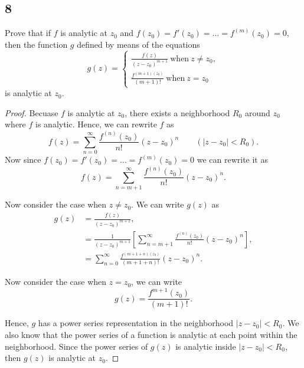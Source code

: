 \documentclass{article}
\begin{document}
\subsection*{8}
Prove that if $f$ is analytic at $z_0$ and $f(z_0) = f'(z_0) = \dots = f^{(m)}(z_0)=0$,
then the function $g$ defined by means of the equations
\begin{equation*}
    g(z) = \begin{cases}
        \frac{f(z)}{(z-z_0)^{m+1}} \ \text{when} \ z \neq z_0, \\
        \frac{f^{(m+1)(z_0)}}{(m+1)!} \ \text{when} \ z = z_0
    \end{cases}
\end{equation*}
is analytic at $z_0$.

\begin{proof}
    Becuase $f$ is analytic at $z_0$, there exists a neighborhood $R_0$ around $z_0$ where
    $f$ is analytic. Hence, we can rewrite $f$ as
    \begin{equation*}
        f(z) = \sum_{n=0}^\infty \frac{f^{(n)}(z_0)}{n!}(z-z_0)^n \qquad (|z-z_0|<R_0).
    \end{equation*}
    Now since $f(z_0) = f'(z_0) = \dots = f^{(m)}(z_0)=0$ we can rewrite it as
    \begin{equation*}
        f(z) = \sum_{n=m+1}^\infty \frac{f^{(n)}(z_0)}{n!}(z-z_0)^n.
    \end{equation*}

    Now consider the case when $z \neq z_0$. We can write $g(z)$ as
    \begin{align*}
        g(z) & = \frac{f(z)}{(z-z_0)^{m+1}},                                   \\
             & = \frac{1}{(z-z_0)^{m+1}}
        \left[\sum_{n=m+1}^\infty \frac{f^{(n)}(z_0)}{n!}(z-z_0)^n\right],     \\
             & = \sum_{n=0}^\infty \frac{f^{(m+1+n)(z_0)}}{(m+1+n)!}(z-z_0)^n.
    \end{align*}

    Now consider the case when $z = z_0$, we can write
    \begin{equation*}
        g(z) = \frac{f^{m+1}(z_0)}{(m+1)!}.
    \end{equation*}

    Hence, $g$ has a power series representation in the neighborhood $|z-z_0|<R_0$.
    We also know that the power series of a function is analytic at each point within
    the neighborhood. Since the power series of $g(z)$ is analytic inside $|z-z_0|<R_0$,
    then $g(z)$ is analytic at $z_0$.
\end{proof}
\end{document}
